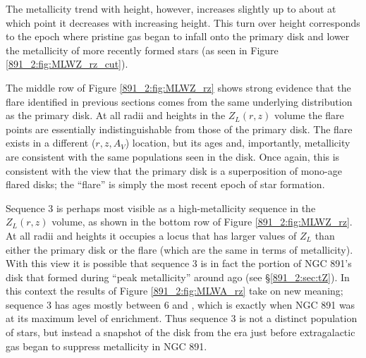 The metallicity trend with height, however, increases slightly up to
about  at which point it decreases with increasing
height. This turn over height corresponds to the epoch where pristine
gas began to infall onto the primary disk and lower the metallicity of
more recently formed stars (as seen in Figure
\ref{891_2:fig:MLWZ_rz_cut}).

The middle row of Figure \ref{891_2:fig:MLWZ_rz} shows strong evidence
that the flare identified in previous sections comes from the same
underlying distribution as the primary disk. At all radii and heights
in the $Z_L(r,z)$ volume the flare points are essentially
indistinguishable from those of the primary disk. The flare exists in
a different ($r,z,A_V$) location, but its ages and, importantly,
metallicity are consistent with the same populations seen in the
disk. Once again, this is consistent with the view that the primary
disk is a superposition of mono-age flared disks; the ``flare'' is
simply the most recent epoch of star formation.


Sequence 3 is perhaps most visible as a high-metallicity sequence in
the $Z_L(r,z)$ volume, as shown in the bottom row of Figure
\ref{891_2:fig:MLWZ_rz}. At all radii and heights it occupies a locus
that has larger values of $Z_L$ than either the primary disk or the
flare (which are the same in terms of metallicity). With this view it
is possible that sequence 3 is in fact the portion of NGC 891's disk
that formed during ``peak metallicity'' around  ago (see
\S\ref{891_2:sec:tZ}). In this context the results of Figure
\ref{891_2:fig:MLWA_rz} take on new meaning; sequence 3 has ages
mostly between 6 and , which is exactly when NGC 891 was
at its maximum level of enrichment. Thus sequence 3 is not a distinct
population of stars, but instead a snapshot of the disk from the era
just before extragalactic gas began to suppress metallicity in NGC 891.



